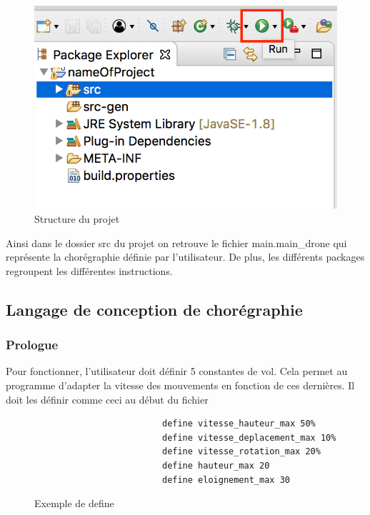 \documentclass[12pt]{article}
\begin{document}
        \begin{figure}[!h]
        \centering
        \includegraphics[scale=0.40]{09.png}
        \caption{Structure du projet}
        \end{figure}
        
        Ainsi dans le dossier src du projet on retrouve le fichier main.main\_drone qui représente la chorégraphie définie par l'utilisateur. De plus, les différents packages regroupent les différentes instructions.
        \subsection{Langage de conception de chorégraphie}
        		\subsubsection{Prologue}
			Pour fonctionner, l'utilisateur doit définir 5 constantes de vol.
			Cela permet au programme d'adapter la vitesse des mouvements en fonction de ces dernières.
			Il doit les définir comme ceci au début du fichier \newline

			\begin{figure}[h!]
  			      \begin{center}
  			          \begin{verbatim}
   			             define vitesse_hauteur_max 50%
   			             define vitesse_deplacement_max 10%
   			             define vitesse_rotation_max 20%
   			             define hauteur_max 20
   			             define eloignement_max 30
   			         \end{verbatim}
   			     \end{center}
    			    \caption{Exemple de define}
    			    \label{Exemple de define}
   			 \end{figure}
\end{document}
